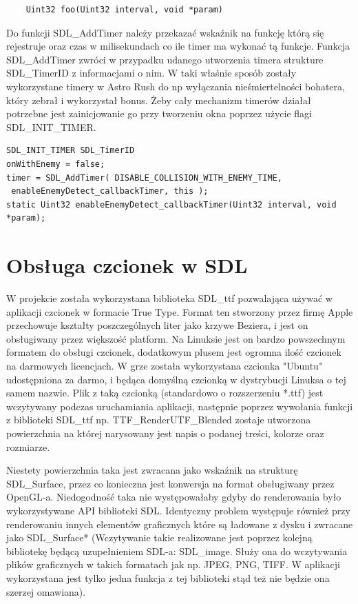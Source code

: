 \begin{verbatim} 
	Uint32 foo(Uint32 interval, void *param)
\end{verbatim}

Do funkcji SDL\_AddTimer należy przekazać wskaźnik na funkcję którą się rejestruje oraz czas w milisekundach co ile timer ma wykonać tą funkcje. 
Funkcja SDL\_AddTimer zwróci w przypadku udanego utworzenia timera strukture SDL\_TimerID z informacjami o nim. W taki właśnie sposób zostały wykorzystane timery w Astro Rush do np wyłączania nieśmiertelności bohatera, który zebrał i wykorzystał bonus. Żeby cały mechanizm timerów działał potrzebne jest zainicjowanie go przy tworzeniu okna poprzez użycie flagi SDL\_INIT\_TIMER.
\begin{verbatim} 
SDL_INIT_TIMER SDL_TimerID
onWithEnemy = false;
timer = SDL_AddTimer( DISABLE_COLLISION_WITH_ENEMY_TIME,
 enableEnemyDetect_callbackTimer, this );
static Uint32 enableEnemyDetect_callbackTimer(Uint32 interval, void *param);
\end{verbatim}

\section{Obsługa czcionek w SDL}
W projekcie została wykorzystana biblioteka SDL\_ttf pozwalająca używać w aplikacji czcionek w formacie True Type. Format ten stworzony przez firmę Apple przechowuje kształty poszczególnych liter jako krzywe Beziera, i jest on obsługiwany przez większość platform. Na Linuksie jest on bardzo powszechnym formatem do obsługi czcionek, dodatkowym plusem jest ogromna ilość czcionek na darmowych licencjach. W grze została wykorzystana czcionka "Ubuntu"  udostępniona za darmo, i będąca domyślną czcionką w dystrybucji Linuksa o tej samem nazwie. Plik z taką czcionką (standardowo o rozszerzeniu *.ttf) jest wczytywany podczas uruchamiania aplikacji, następnie poprzez wywołania funkcji z biblioteki SDL\_ttf np. TTF\_RenderUTF\_Blended zostaje utworzona powierzchnia na której narysowany jest napis o podanej treści, kolorze oraz rozmiarze. 

Niestety powierzchnia taka jest zwracana jako wskaźnik na strukturę SDL\_Surface, przez co konieczna jest konwersja na format obsługiwany przez OpenGL-a. Niedogodność taka nie występowałaby gdyby do renderowania było wykorzystywane API biblioteki SDL. Identyczny problem występuje również przy renderowaniu innych elementów graficznych które są ładowane z dysku i zwracane jako SDL\_Surface* (Wczytywanie takie realizowane jest poprzez kolejną bibliotekę będącą uzupełnieniem SDL-a: SDL\_image. Służy ona do wczytywania plików graficznych w takich formatach jak np. JPEG, PNG, TIFF. W aplikacji wykorzystana jest tylko jedna funkcja 
z tej biblioteki stąd też nie będzie ona szerzej omawiana).

